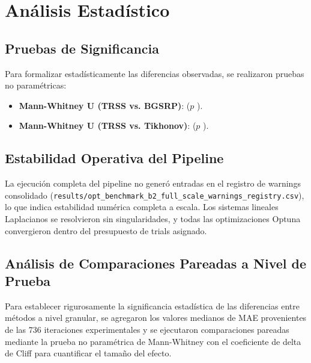 \section{Análisis Estadístico}

\subsection{Pruebas de Significancia}

Para formalizar estadísticamente las diferencias observadas, se realizaron pruebas no paramétricas:

\begin{itemize}
    \item \textbf{Mann-Whitney U (TRSS vs. BGSRP)}: \StatTRSSGSRPResult{} ($p$ \StatTRSSBGSRPpval).
    \item \textbf{Mann-Whitney U (TRSS vs. Tikhonov)}: \StatTRSSGSPResult{} ($p$ \StatTRSSGSPpval).
\end{itemize}

\subsection{Estabilidad Operativa del Pipeline}

La ejecución completa del pipeline no generó entradas en el registro de warnings consolidado (\texttt{results/opt\_benchmark\_b2\_full\_scale\_warnings\_registry.csv}), lo que indica estabilidad numérica completa a escala. Los sistemas lineales Laplacianos se resolvieron sin singularidades, y todas las optimizaciones Optuna convergieron dentro del presupuesto de trials asignado.

\subsection{Análisis de Comparaciones Pareadas a Nivel de Prueba}

Para establecer rigurosamente la significancia estadística de las diferencias entre métodos a nivel granular, se agregaron los valores medianos de MAE provenientes de las 736 iteraciones experimentales y se ejecutaron comparaciones pareadas mediante la prueba no paramétrica de Mann-Whitney con el coeficiente de delta de Cliff para cuantificar el tamaño del efecto.



